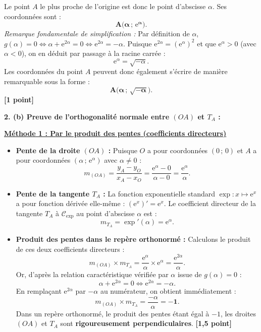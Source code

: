 \documentclass[11pt,a4paper]{article}
\newcommand{\e}{\mathrm{e}}
\begin{document}
\begin{correctionbox}
Le point $A$ le plus proche de l'origine est donc le point d'abscisse $\alpha$.
Ses coordonnées sont :
\[
\mathbf{A\bigl(\alpha\,;\,\e^\alpha\bigr)}.
\]
\textit{Remarque fondamentale de simplification :}
Par définition de $\alpha$, $g(\alpha) = 0 \iff \alpha + \e^{2\alpha} = 0 \iff \e^{2\alpha} = -\alpha$.
Puisque $\e^{2\alpha} = (\e^\alpha)^2$ et que $\e^\alpha > 0$ (avec $\alpha < 0$), on en déduit par passage à la racine carrée :
\[
\e^\alpha = \sqrt{-\alpha}.
\]
Les coordonnées du point $A$ peuvent donc également s'écrire de manière remarquable sous la forme :
\[
\mathbf{A\bigl(\alpha\,;\,\sqrt{-\alpha}\bigr)}.
\] \hfill \textbf{[1 point]}

\medskip
\textbf{2. (b) Preuve de l'orthogonalité normale entre $(OA)$ et $T_A$ :}

\underline{\textbf{Méthode 1 : Par le produit des pentes (coefficients directeurs)}}
\begin{itemize}[leftmargin=*]
    \item \textbf{Pente de la droite $(OA)$ :}
    Puisque $O$ a pour coordonnées $(0\,;\,0)$ et $A$ a pour coordonnées $(\alpha\,;\,\e^\alpha)$ avec $\alpha \neq 0$ :
    \[
    m_{(OA)} = \frac{y_A - y_O}{x_A - x_O} = \frac{\e^\alpha - 0}{\alpha - 0} = \frac{\e^\alpha}{\alpha}.
    \]
    \item \textbf{Pente de la tangente $T_A$ :}
    La fonction exponentielle standard $\exp : x \mapsto \e^x$ a pour fonction dérivée elle-même : $(\e^x)' = \e^x$.
    Le coefficient directeur de la tangente $T_A$ à $\mathcal{C}_{\exp}$ au point d'abscisse $\alpha$ est :
    \[
    m_{T_A} = \exp'(\alpha) = \e^\alpha.
    \]
    \item \textbf{Produit des pentes dans le repère orthonormé :}
    Calculons le produit de ces deux coefficients directeurs :
    \[
    m_{(OA)} \times m_{T_A} = \frac{\e^\alpha}{\alpha} \times \e^\alpha = \frac{\e^{2\alpha}}{\alpha}.
    \]
    Or, d'après la relation caractéristique vérifiée par $\alpha$ issue de $g(\alpha) = 0$ :
    \[
    \alpha + \e^{2\alpha} = 0 \iff \e^{2\alpha} = -\alpha.
    \]
    En remplaçant $\e^{2\alpha}$ par $-\alpha$ au numérateur, on obtient immédiatement :
    \[
    m_{(OA)} \times m_{T_A} = \frac{-\alpha}{\alpha} = \mathbf{-1}.
    \]
    Dans un repère orthonormé, le produit des pentes étant égal à $-1$, les droites $(OA)$ et $T_A$ sont \textbf{rigoureusement perpendiculaires}. \hfill \textbf{[1{,}5 point]}
\end{itemize}


\end{correctionbox}
\end{document}
